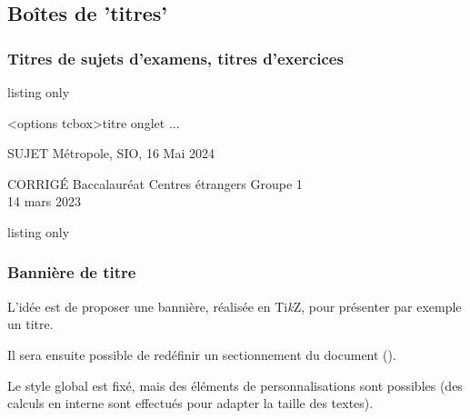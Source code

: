 \documentclass[french,11pt,a4paper]{article}
\providecommand\tikzlogo{Ti\textit{k}Z}
\let\TikZ\tikzlogo
\begin{document}
\subsection{Boîtes de 'titres'}

\subsubsection{Titres de sujets d'examens, titres d'exercices}

\begin{DemoCode}{listing only}
\begin{TitreSujet}[Couleur=...,AlignH=...]<options tcbox>{titre onglet}
...
\end{TitreSujet}
\end{DemoCode}

\begin{DemoCode}{}
\begin{TitreSujet}[Couleur=red!50!black]{SUJET}
Métropole, SIO, 16 Mai 2024
\end{TitreSujet}
\end{DemoCode}

\begin{DemoCode}{}
\begin{TitreSujet}[Couleur=teal,AlignH=center]{CORRIGÉ}
Baccalauréat Centres étrangers Groupe 1\\
14 mars 2023
\end{TitreSujet}
\end{DemoCode}

\begin{DemoCode}{listing only}
\end{DemoCode}

\begin{DemoCode}{}

\end{DemoCode}

\subsubsection{Bannière de titre}

L'idée est de proposer une bannière, réalisée en \TikZ, pour présenter par exemple un titre.

Il sera ensuite possible de redéfinir un sectionnement du document ().

Le style global est fixé, mais des éléments de personnalisations sont possibles (des calculs en interne sont effectués pour adapter la taille des textes).
\end{document}
